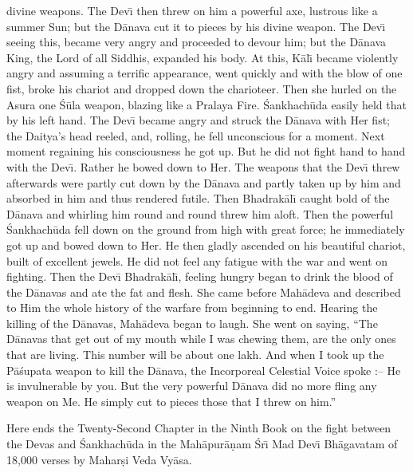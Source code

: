 divine weapons. The Dev\={\i} then threw on him a powerful axe, lustrous like a summer Sun; but the D\=anava cut it to pieces by his divine weapon. The Dev\={\i} seeing this, became very angry and proceeded to devour him; but the D\=anava King, the Lord of all Siddhis, expanded his body. At this, K\=al\={\i} became violently angry and assuming a terrific appearance, went quickly and with the blow of one fist, broke his chariot and dropped down the charioteer. Then she hurled on the Asura one \'S\=ula weapon, blazing like a Pralaya Fire. \'Sankhach\=uda easily held that by his left hand. The Dev\={\i} became angry and struck the D\=anava with Her fist; the Daitya's head reeled, and, rolling, he fell unconscious for a moment. Next moment regaining his consciousness he got up. But he did not fight hand to hand with the Dev\={\i}. Rather he bowed down to Her. The weapons that the Dev\={\i} threw afterwards were partly cut down by the D\=anava and partly taken up by him and absorbed in him and thus rendered futile. Then Bhadrak\=al\={\i} caught bold of the D\=anava and whirling him round and round threw him aloft. Then the powerful \'Sankhach\=uda fell down on the ground from high with great force; he immediately
got up and bowed down to Her. He then gladly ascended on his beautiful chariot, built of excellent jewels. He did not feel any fatigue with the war and went on fighting. Then the Dev\={\i} Bhadrak\=al\={\i}, feeling hungry began to drink the blood of the D\=anavas and ate the fat and flesh. She came before Mah\=adeva and described to Him the whole history of the warfare from beginning to end. Hearing the killing of the D\=anavas, Mah\=adeva began to laugh. She went on saying, ``The D\=anavas that get out of my mouth while I was chewing them, are the only ones that are living. This number will be about one lakh. And when I took up the P\=a\'supata weapon to kill the D\=anava, the Incorporeal Celestial Voice spoke :-- He is invulnerable by you. But the very powerful D\=anava did no more fling any weapon on Me. He simply cut to pieces those that I threw on him.''

Here ends the Twenty-Second Chapter in the Ninth Book on the fight between the Devas and \'Sankhach\=uda in the Mah\=apur\=a\d{n}am \'Sr\={\i} Mad Dev\={\i} Bh\=agavatam of 18,000 verses by Mahar\d{s}i Veda Vy\=asa.



